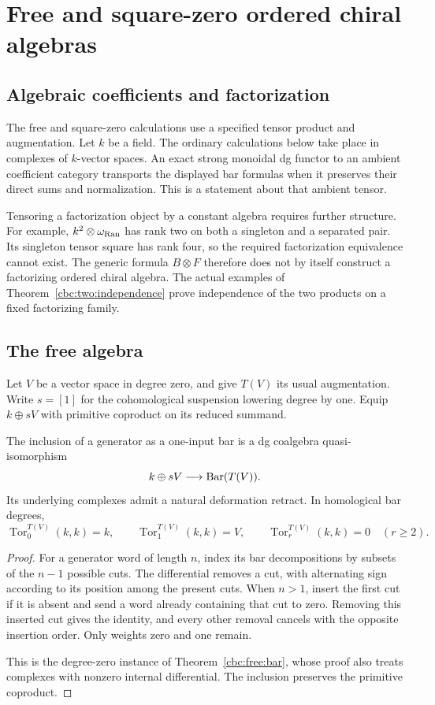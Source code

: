 \chapter{Free and square-zero ordered chiral algebras}

\section{Algebraic coefficients and factorization}
The free and square-zero calculations use a specified tensor product and augmentation.
Let $k$ be a field.
The ordinary calculations below take place in complexes of $k$-vector spaces.
An exact strong monoidal dg functor to an ambient coefficient category transports the displayed bar formulas when it preserves their direct sums and normalization.
This is a statement about that ambient tensor.

Tensoring a factorization object by a constant algebra requires further structure.
For example, $k^2\otimes\omega_{\operatorname{Ran}}$ has rank two on both a singleton and a separated pair.
Its singleton tensor square has rank four, so the required factorization equivalence cannot exist.
The generic formula $B\otimes F$ therefore does not by itself construct a factorizing ordered chiral algebra.
The actual examples of Theorem~\ref{cbc:two:independence} prove independence of the two products on a fixed factorizing family.

\section{The free algebra}
Let $V$ be a vector space in degree zero, and give $T(V)$ its usual augmentation.
Write $s=[1]$ for the cohomological suspension lowering degree by one.
Equip $k\oplus sV$ with primitive coproduct on its reduced summand.

\begin{theorem}\label{thm:free-bar}
The inclusion of a generator as a one-input bar is a dg coalgebra quasi-isomorphism
\[
 k\oplus sV\longrightarrow\operatorname{Bar}(T(V)).
\]
Its underlying complexes admit a natural deformation retract.
In homological bar degrees,
\[
 \operatorname{Tor}^{T(V)}_0(k,k)=k,\qquad
 \operatorname{Tor}^{T(V)}_1(k,k)=V,\qquad
 \operatorname{Tor}^{T(V)}_r(k,k)=0\quad(r\ge2).
\]
\end{theorem}
\begin{proof}
For a generator word of length $n$, index its bar decompositions by subsets of the $n-1$ possible cuts.
The differential removes a cut, with alternating sign according to its position among the present cuts.
When $n>1$, insert the first cut if it is absent and send a word already containing that cut to zero.
Removing this inserted cut gives the identity, and every other removal cancels with the opposite insertion order.
Only weights zero and one remain.

This is the degree-zero instance of Theorem~\ref{cbc:free:bar}, whose proof also treats complexes with nonzero internal differential.
The inclusion preserves the primitive coproduct.
\end{proof}


